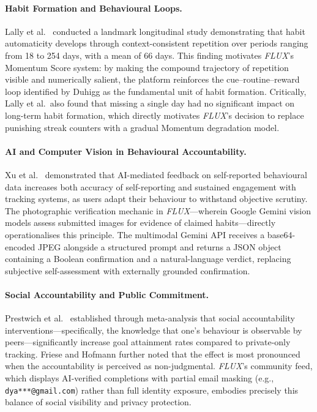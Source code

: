 \documentclass[12pt,a4paper]{article}
\newcommand{\FL}{\textit{FLUX}}
\begin{document}
\paragraph{Habit Formation and Behavioural Loops.}
Lally et al.\ \cite{lally2010} conducted a landmark longitudinal study demonstrating
that habit automaticity develops through context-consistent repetition over periods
ranging from 18 to 254 days, with a mean of 66 days. This finding motivates
\FL{}'s Momentum Score system: by making the compound trajectory of repetition
visible and numerically salient, the platform reinforces the cue--routine--reward
loop identified by Duhigg \cite{duhigg2012} as the fundamental unit of habit
formation. Critically, Lally et al.\ also found that missing a single day had
no significant impact on long-term habit formation, which directly motivates
\FL{}'s decision to replace punishing streak counters with a gradual Momentum
degradation model.

\paragraph{AI and Computer Vision in Behavioural Accountability.}
Xu et al.\ \cite{xu2021} demonstrated that AI-mediated feedback on self-reported
behavioural data increases both accuracy of self-reporting and sustained engagement
with tracking systems, as users adapt their behaviour to withstand objective scrutiny.
The photographic verification mechanic in \FL{}---wherein Google Gemini vision
models assess submitted images for evidence of claimed habits---directly
operationalises this principle. The multimodal Gemini API receives a base64-encoded
JPEG alongside a structured prompt and returns a JSON object containing a Boolean
confirmation and a natural-language verdict, replacing subjective self-assessment
with externally grounded confirmation.

\paragraph{Social Accountability and Public Commitment.}
Prestwich et al.\ \cite{prestwich2012} established through meta-analysis that social
accountability interventions---specifically, the knowledge that one's behaviour is
observable by peers---significantly increase goal attainment rates compared to
private-only tracking. Friese and Hofmann \cite{friese2016} further noted that the
effect is most pronounced when the accountability is perceived as non-judgmental.
\FL{}'s community feed, which displays AI-verified completions with partial email
masking (e.g., \texttt{dya***@gmail.com}) rather than full identity exposure,
embodies precisely this balance of social visibility and privacy protection.
\end{document}
